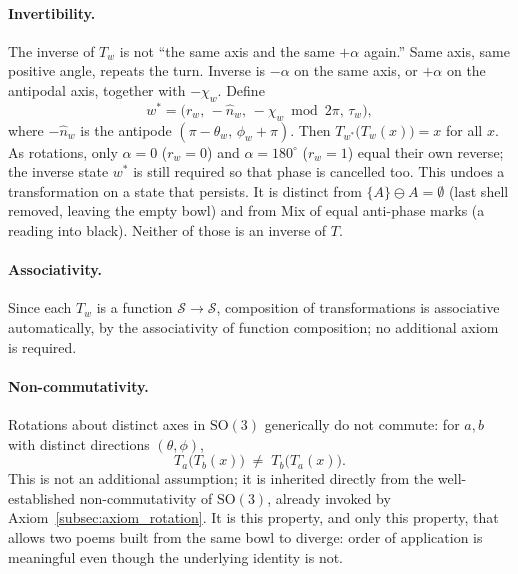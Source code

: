\documentclass[12pt, a4paper]{article}
\begin{document}
\paragraph{Invertibility.}
The inverse of $T_w$ is not ``the same axis and the same $+\alpha$ again.'' Same axis, same positive angle, repeats the turn. Inverse is $-\alpha$ on the same axis, or $+\alpha$ on the antipodal axis, together with $-\chi_w$. Define
\begin{equation}
    w^{*} = \bigl(r_w,\,-\hat n_w,\,-\chi_w \bmod 2\pi,\,\tau_w\bigr),
\end{equation}
where $-\hat n_w$ is the antipode $(\pi-\theta_w,\,\phi_w+\pi)$.
Then $T_{w^{*}}\!\big(T_w(x)\big) = x$ for all $x$. As rotations, only $\alpha=0$ ($r_w=0$) and $\alpha=180^\circ$ ($r_w=1$) equal their own reverse; the inverse state $w^{*}$ is still required so that phase is cancelled too. This undoes a transformation on a state that persists. It is distinct from $\{A\}\ominus A=\emptyset$ (last shell removed, leaving the empty bowl) and from Mix of equal anti-phase marks (a reading into black). Neither of those is an inverse of $T$.

\paragraph{Associativity.} Since each $T_w$ is a function
$\mathcal{S} \to \mathcal{S}$, composition of transformations is
associative automatically, by the associativity of function
composition; no additional axiom is required.

\paragraph{Non-commutativity.} Rotations about distinct axes in
$\mathrm{SO}(3)$ generically do not commute: for $a, b$ with distinct
directions $(\theta,\phi)$,
\begin{equation}
    T_a\big(T_b(x)\big) \;\neq\; T_b\big(T_a(x)\big).
    \label{eq:noncommute}
\end{equation}
This is not an additional assumption; it is inherited directly from
the well-established non-commutativity of $\mathrm{SO}(3)$, already
invoked by Axiom~\ref{subsec:axiom_rotation}. It is this property,
and only this property, that allows two poems built from the same
bowl to diverge: order of application is meaningful even
though the underlying identity is not.
\end{document}
